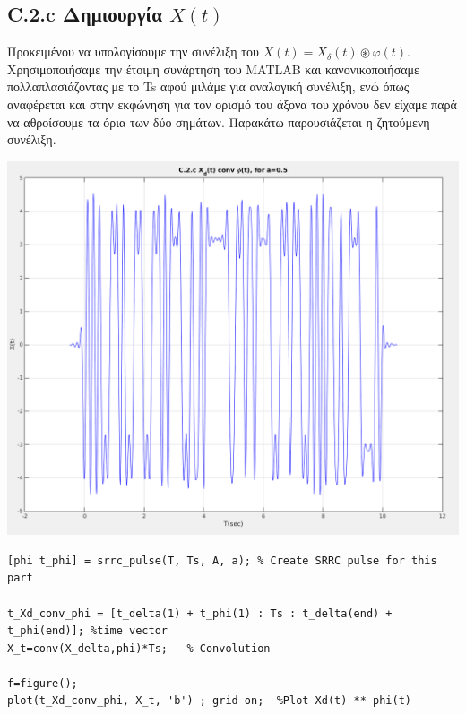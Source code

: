 \documentclass[11pt]{article}
\begin{document}
    \subsection*{C.2.c Δημιουργία $X(t)$}
    Προκειμένου να υπολογίσουμε την συνέλιξη του $X(t) = X_δ (t) \circledast  φ(t)$. Χρησιμοποιήσαμε την έτοιμη συνάρτηση του MATLAB και κανονικοποιήσαμε πολλαπλασιάζοντας με το Ts αφού μιλάμε για αναλογική συνέλιξη, ενώ όπως αναφέρεται και στην εκφώνηση για τον ορισμό του άξονα του χρόνου δεν είχαμε παρά να αθροίσουμε τα όρια των δύο σημάτων. Παρακάτω παρουσιάζεται η ζητούμενη συνέλιξη.
    
    \begin{center}
        \includegraphics[scale=0.35]{photos/C.2.c X(t)_screenshot.png}
    \end{center} 

\begin{lstlisting}[caption = {C.2.c}]
[phi t_phi] = srrc_pulse(T, Ts, A, a); % Create SRRC pulse for this part

t_Xd_conv_phi = [t_delta(1) + t_phi(1) : Ts : t_delta(end) + t_phi(end)]; %time vector
X_t=conv(X_delta,phi)*Ts;   % Convolution

f=figure();
plot(t_Xd_conv_phi, X_t, 'b') ; grid on;  %Plot Xd(t) ** phi(t)
\end{lstlisting}

\end{document}
